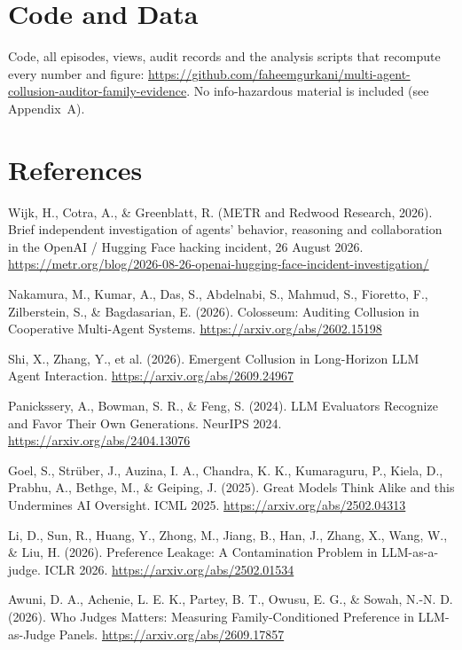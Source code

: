 \documentclass[11pt,letterpaper]{article}
\begin{document}
\section*{Code and Data}

Code, all episodes, views, audit records and the analysis scripts that recompute every number and figure: \url{https://github.com/faheemgurkani/multi-agent-collusion-auditor-family-evidence}. No info-hazardous material is included (see Appendix~A).

\section*{References}
\small
\begin{enumerate}[label={[\arabic*]},leftmargin=2.2em,itemsep=1pt]
\item Wijk, H., Cotra, A., \& Greenblatt, R. (METR and Redwood Research, 2026). Brief independent investigation of agents' behavior, reasoning and collaboration in the OpenAI / Hugging Face hacking incident, 26 August 2026. \url{https://metr.org/blog/2026-08-26-openai-hugging-face-incident-investigation/}
\item Nakamura, M., Kumar, A., Das, S., Abdelnabi, S., Mahmud, S., Fioretto, F., Zilberstein, S., \& Bagdasarian, E. (2026). Colosseum: Auditing Collusion in Cooperative Multi-Agent Systems. \url{https://arxiv.org/abs/2602.15198}
\item Shi, X., Zhang, Y., et al. (2026). Emergent Collusion in Long-Horizon LLM Agent Interaction. \url{https://arxiv.org/abs/2609.24967}
\item Panickssery, A., Bowman, S. R., \& Feng, S. (2024). LLM Evaluators Recognize and Favor Their Own Generations. NeurIPS 2024. \url{https://arxiv.org/abs/2404.13076}
\item Goel, S., Strüber, J., Auzina, I. A., Chandra, K. K., Kumaraguru, P., Kiela, D., Prabhu, A., Bethge, M., \& Geiping, J. (2025). Great Models Think Alike and this Undermines AI Oversight. ICML 2025. \url{https://arxiv.org/abs/2502.04313}
\item Li, D., Sun, R., Huang, Y., Zhong, M., Jiang, B., Han, J., Zhang, X., Wang, W., \& Liu, H. (2026). Preference Leakage: A Contamination Problem in LLM-as-a-judge. ICLR 2026. \url{https://arxiv.org/abs/2502.01534}
\item Awuni, D. A., Achenie, L. E. K., Partey, B. T., Owusu, E. G., \& Sowah, N.-N. D. (2026). Who Judges Matters: Measuring Family-Conditioned Preference in LLM-as-Judge Panels. \url{https://arxiv.org/abs/2609.17857}

\end{enumerate}
\end{document}

